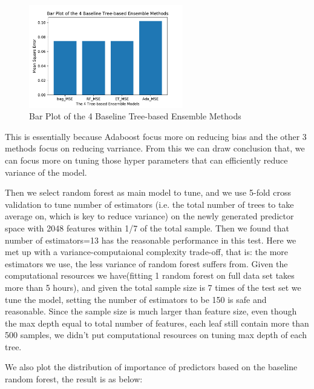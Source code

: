 \documentclass[11pt]{article}
\begin{document}
\begin{enumerate}
\begin{enumerate}
\begin{figure}[h]
\centering
\includegraphics[width=0.6\textwidth]{MSE_ensemble}
\caption{Bar Plot of the 4 Baseline Tree-based Ensemble Methods}
\label{fig:MSE_ensemble}
\end{figure}


This is essentially because Adaboost focus more on reducing bias and the other 3 methods focus on reducing varriance. From this we can draw conclusion that, we can focus more on tuning those hyper parameters that can efficiently reduce variance of the model. 

Then we select random forest as main model to tune, and we use 5-fold cross validation to tune number of estimators (i.e. the total number of trees to take average on, which is key to reduce variance) on the newly generated predictor space with 2048 features within 1/7 of the total sample. Then we found that number of estimators=13 has the reasonable performance in this test. Here we met up with a variance-computaional complexity trade-off, that is: the more estimators we use, the less variance of random forest suffers from. Given the computational resources we have(fitting 1 random forest on full data set takes more than 5 hours), and given the total sample size is 7 times of the test set we tune the model, setting the number of estimators to be 150 is safe and reasonable. Since the sample size is much larger than feature size, even though the max depth equal to total number of features, each leaf still contain more than 500 samples, we didn't put computational resources on tuning max depth of each tree.

We also plot the distribution of importance of predictors based on the baseline random forest, the result is as below:


\end{enumerate}
\end{enumerate}
\end{document}
